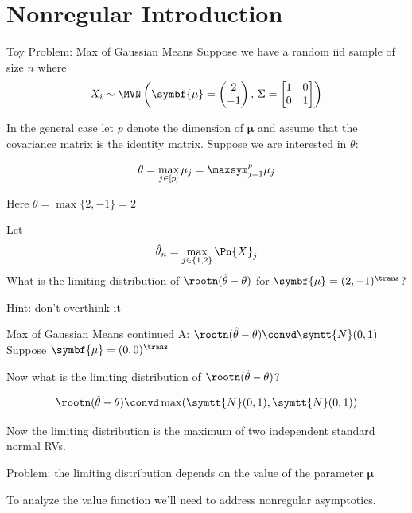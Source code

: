 \documentclass[aspectratio=169, professionalfonts]{beamer}
\begin{document}
\section{Nonregular Introduction}
\begin{frame}{Toy Problem: Max of Gaussian Means}
	Suppose we have a random iid sample of size $n$ where
	\begin{equation*}
		X_i \sim \MVN \left(\symbf{\mu} = \begin{pmatrix}2 \\ -1 \end{pmatrix},\, \Sigma = \begin{bmatrix}1 & 0
               \\ 0 & 1\end{bmatrix} \right)
	\end{equation*}

	\vfill
	\pause

	In the general case let $p$ denote the dimension of $\symbf{\mu}$ and assume
	that the covariance matrix is the identity matrix. Suppose we are interested
	in $\theta$:

	$$\theta = \max_{j \in
			[p]} \mu_j = \maxsym_{j = 1}^{p} \mu_j$$
	\vfill

	Here $\theta = \max \{2, -1\} = 2$

	\vfill
	\pause
	Let $$\hat{\theta}_n = \max_{j \in \{1, 2 \}} \Pn {X}_j $$
	\vfill
	\pause
	What is the limiting distribution of $\rootn (\hat{\theta} - \theta)$ for $\symbf{\mu} =
		(2, -1 )^{\trans}$?

	Hint: don't overthink it
\end{frame}

\begin{frame}{Max of Gaussian Means continued}
	A: $\rootn (\hat{\theta} - \theta) \convd \symtt{N}(0, 1)$
	\pause
	\vfill
	Suppose $\symbf{\mu} = (0 , 0)^{\trans}$

	Now what is the limiting distribution of $ \rootn (\hat{\theta} - \theta)$?

	\vfill \pause

	$$\rootn (\hat{\theta} - \theta) \convd \max(\symtt{N}(0, 1), \symtt{N}(0, 1))$$

	Now the limiting distribution is the maximum of two independent standard
	normal RVs.

	\vfill \pause

	Problem: the limiting distribution depends on the value of the parameter
	$\symbf{\mu}$

	\vfill

	To analyze the value function we'll need to address nonregular asymptotics.
\end{frame}
\end{document}
